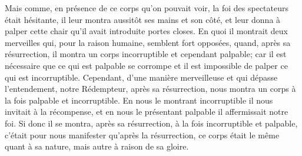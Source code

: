 Mais comme, en présence de ce corps qu’on pouvait voir,
	la foi des spectateurs était hésitante,
	il leur montra aussitôt ses mains et son côté,
	et leur donna à palper cette chair qu’il avait introduite portes closes.
En quoi il montrait deux merveilles
	qui, pour la raison humaine, semblent fort opposées,
	quand, après sa résurrection,
		il montra un corps incorruptible et cependant palpable;
	car il est nécessaire que ce qui est palpable se corrompe
	et il est impossible de palper ce qui est incorruptible.
Cependant, d’une manière merveilleuse et qui dépasse l’entendement,
	notre Rédempteur, après sa résurrection,
	nous montra un corps à la fois palpable et incorruptible.
En nous le montrant incorruptible il nous invitait à la récompense,
	et en nous le présentant palpable il affermissait notre foi.
Si donc il se montra, après sa résurrection,
	à la fois incorruptible et palpable,
	c’était pour nous manifester qu’après la résurrection,
	ce corps était le même quant à sa nature, mais autre à raison de sa gloire.

